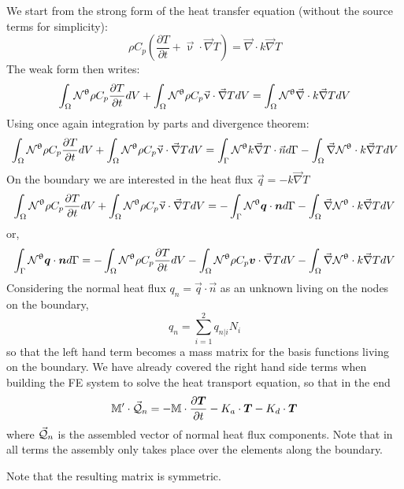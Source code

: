 We start from the strong form of the heat transfer equation (without the source terms for simplicity):
\[
\rho C_p
\left(\frac{\partial T}{\partial t} + \vec{\upnu}\cdot \vec{\nabla}T\right)
=
\vec{\nabla} \cdot k\vec{\nabla} T
\]
The weak form then writes:
\[
\int_\Omega {\mathcal{N}}^\uptheta
\rho C_p
\frac{\partial T}{\partial t} dV 
+
\int_\Omega {\mathcal{N}}^\uptheta
\rho C_p
\vec{\upnu}\cdot \vec{\nabla}T  dV
=
\int_\Omega {\mathcal{N}}^\uptheta
\vec{\nabla} \cdot k\vec{\nabla} T dV
\]
Using once again integration by parts and divergence theorem:
\[
\int_\Omega {\mathcal{N}}^\uptheta
\rho C_p
\frac{\partial T}{\partial t} dV 
+
\int_\Omega {\mathcal{N}}^\uptheta
\rho C_p
\vec{\upnu}\cdot \vec{\nabla}T  dV
=
\int_\Gamma {\mathcal{N}}^\uptheta k \vec{\nabla} T \cdot \vec{n} d\Gamma
-
\int_\Omega  \vec{\nabla} {\mathcal{N}}^\uptheta \cdot k \vec{\nabla} T dV
\]
On the boundary we are interested in the heat flux $\vec{q}=-k \vec{\nabla} T$
\[
\int_\Omega {\mathcal{N}}^\uptheta
\rho C_p
\frac{\partial T}{\partial t} dV 
+
\int_\Omega {\mathcal{N}}^\uptheta
\rho C_p
\vec{\upnu}\cdot \vec{\nabla} T  dV
=
-\int_\Gamma {\mathcal{N}}^\uptheta {\bm q} \cdot {\bm n} d\Gamma
- \int_\Omega  \vec{\nabla} {\mathcal{N}}^\uptheta \cdot k \vec{\nabla} T dV
\]
or,
\[
\int_\Gamma {\mathcal{N}}^\uptheta {\bm q} \cdot {\bm n} d\Gamma
=
-\int_\Omega {\mathcal{N}}^\uptheta
\rho C_p
\frac{\partial T}{\partial t} dV 
-
\int_\Omega {\mathcal{N}}^\uptheta
\rho C_p  {\bm v}\cdot \vec{\nabla} T  dV
- \int_\Omega  \vec{\nabla} {\mathcal{N}}^\uptheta \cdot k \vec{\nabla} T dV
\]
Considering the normal heat flux $q_n = \vec{q} \cdot \vec{n}$ as an unknown 
living on the nodes on the boundary, 
\[
q_n = \sum_{i=1}^2 q_{n|i} N_i
\]
so that the left hand term becomes a mass matrix for the basis functions living on 
the boundary.
We have already covered the right hand side terms when building the FE system 
to solve the heat transport equation, so that in the end 
\[
{\mathbb{M}}' \cdot \vec{\cal Q}_n =
- {\mathbb{M}} \cdot \frac{\partial \bm T}{\partial t} -K_a \cdot {\bm T} - K_d \cdot {\bm T} 
\]
where $\vec{\cal Q}_n$ is the assembled vector of normal heat flux components.
Note that in all terms the assembly only takes place over the elements along the boundary.


Note that the resulting matrix is symmetric.


